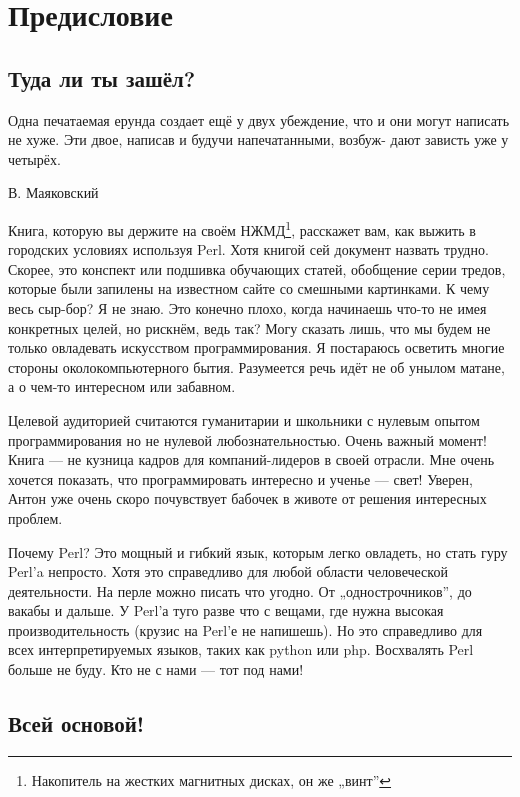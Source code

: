 \section{Предисловие}
\subsection{Туда ли ты зашёл?}
\begin{em}
Одна печатаемая ерунда создает ещё у двух убеждение, что и они могут
написать не хуже. Эти двое, написав и будучи напечатанными, возбуж-
дают зависть уже у четырёх.
\begin{flushright}
В. Маяковский
\end{flushright}
\end{em}
Книга, которую вы держите на своём НЖМД\footnote{Накопитель
на жестких магнитных дисках, он же „винт”}, расскажет вам, как выжить
в городских условиях используя Perl. Хотя книгой сей документ назвать
трудно. Скорее, это конспект или подшивка обучающих статей, обобщение серии
тредов, которые были запилены на известном сайте со смешными картинками.
К чему весь сыр-бор? Я не знаю. Это конечно плохо, когда начинаешь
что-то не имея конкретных целей, но рискнём, ведь так? Могу сказать
лишь, что мы будем не только овладевать искусством программирования. 
Я постараюсь осветить многие стороны околокомпьютерного бытия.
Разумеется речь идёт не об унылом матане, а о чем-то интересном или 
забавном.

Целевой аудиторией считаются гуманитарии и школьники с нулевым
опытом программирования но не нулевой любознательностью. Очень важный
момент! Книга — не кузница кадров для компаний-лидеров в своей
отрасли. Мне очень хочется показать, что программировать интересно и
ученье — свет! Уверен, Антон уже очень скоро почувствует бабочек в
животе от решения интересных проблем.

Почему Perl? Это мощный и гибкий язык, которым легко овладеть, но
стать гуру Perl’a непросто. Хотя это справедливо для любой области
человеческой деятельности. На перле можно писать что угодно. От
„однострочников”, до вакабы и дальше. У Perl’а туго разве что с вещами,
где нужна высокая производительность (крузис на Perl’е не напишешь).
Но это справедливо для всех интерпретируемых языков, таких как python
или php. Восхвалять Perl больше не буду. Кто не с нами — тот под нами!

\subsection{Всей основой!}

